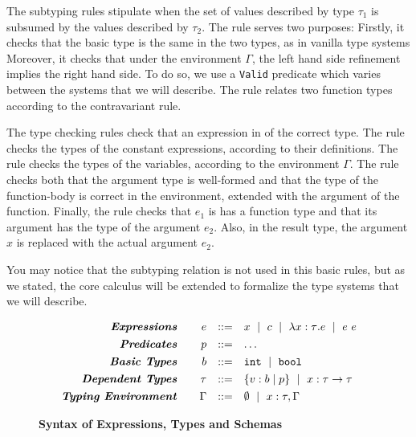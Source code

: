 The subtyping rules stipulate when the set of values described 
by type $\tau_1$ is subsumed by the values described by $\tau_2$.
%
The rule \tsubBase serves two purposes:
Firstly,
it checks that the basic type is the same in the two types, 
as in vanilla type systems
Moreover, it checks that under the environment $\Gamma$, 
the left hand side refinement implies the right hand side.
To do so, we use a \texttt{Valid} predicate which varies between the systems that we will describe.
%
The rule \tsubFun relates two function types according to the contravariant rule.

The type checking rules check that an expression in of the correct type.
The rule \tconst checks the types of the constant expressions, according 
to their definitions.
The rule \tvariable checks the types of the variables, according 
to the environment $\Gamma$.
The rule \tfunction checks both that the argument type is well-formed 
and that the type of the function-body
is correct in the environment, extended with the argument of the function.
Finally, the rule \tapp checks that $e_1$ is has a function type
and that its argument has the type of the argument $e_2$.
Also, in the result type, the argument $x$ is replaced with the actual argument $e_2$.

You may notice that the subtyping relation 
is not used in this basic rules,
but as we stated, the core calculus will be extended to formalize the
type systems that we will describe.

\begin{figure}[t!]
\centering
$$
\begin{array}{rrcl}
\emphbf{Expressions} \quad 
  & e 
  & ::= 
  &      x 
  \spmid c 
  \spmid \efunt{x}{\tau}{e} 
  \spmid \eapp{e}{e} 
  \\[0.05in] 

\emphbf{Predicates} \quad 
  & p
  & ::= 
  & \dots
  \\[0.05in] 

\emphbf{Basic Types} \quad 
  & b 
  & ::= 
  &      \tbint
  \spmid \tbbool
  \\[0.05in]

\emphbf{Dependent Types} \quad 
  & \tau 
  & ::= 
  &      \tref{b}{p} 
  \spmid \tfun{x}{\tau}{\tau}
  \\[0.05in]

\emphbf{Typing Environment} \quad 
  & \Gamma 
  & ::= 
  &      \emptyset 
  \spmid x:\tau, \Gamma

\end{array}
$$
\caption{\textbf{Syntax of Expressions, Types and Schemas}}
\label{fig:syntax}
\end{figure}


